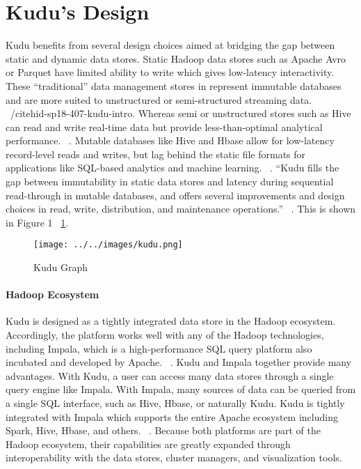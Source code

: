 \section{Kudu's Design} Kudu benefits from several design choices aimed at bridging the gap between static and dynamic data stores. Static Hadoop data stores such as Apache Avro or Parquet have limited ability to write which gives low-latency interactivity. These ``traditional'' data management stores in represent immutable databases and are more suited to unstructured or semi-structured streaming data. ~/cite{hid-sp18-407-kudu-intro}. Whereas semi or unstructured stores such as Hive can read and write real-time data but provide less-than-optimal analytical performance. ~\cite{hid-sp18-407-impala-intro}. Mutable databases like Hive and Hbase allow for low-latency record-level reads and writes, but lag behind the static file formats for applications like SQL-based analytics and machine learning. ~\cite{hid-sp18-407-kudu-impala-integration}. ``Kudu fills the gap between immutability in static data stores and latency during sequential read-through in mutable databases, and offers several improvements and design choices in read, write, distribution, and maintenance operations.'' ~\cite{hid-sp18-407-impala-intro}. This is shown in Figure 1 ~\ref{f:kudu}. 
\begin{figure}[!ht]
  \centering\texttt{[image: ../../images/kudu.png]}
  \caption{Kudu Graph}\label{f:kudu}
\end{figure}
\paragraph{Hadoop Ecosystem} Kudu is designed as a tightly integrated data store in the Hadoop ecosystem. Accordingly, the platform works well with any of the Hadoop technologies, including Impala, which is a high-performance SQL query platform also incubated and developed by Apache. ~\cite{hid-sp18-407-impala-intro}. Kudu and Impala together provide many advantages. With Kudu, a user can access many data stores through a single query engine like Impala. With Impala, many sources of data can be queried from a single SQL interface, such as Hive, Hbase, or naturally Kudu. Kudu is tightly integrated with Impala which supports the entire Apache ecosystem including Spark, Hive, Hbase, and others. ~\cite{hid-sp18-407-benchmarking-kudu}. Because both platforms are part of the Hadoop ecosystem, their capabilities are greatly expanded through interoperability with the data stores, cluster managers, and visualization tools.
